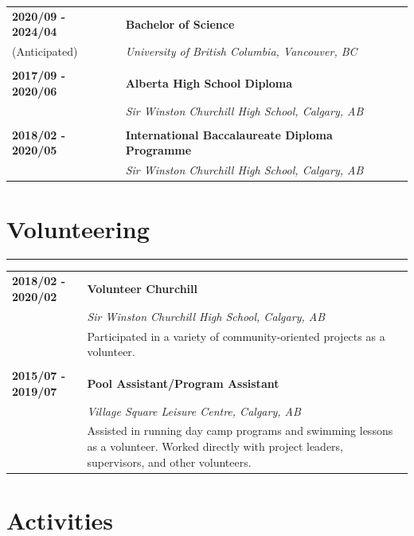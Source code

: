 \documentclass[letterpaper]{article}
\newcommand{\horizontalLine}{%
    \rule{\textwidth}{0.2pt}
    \vspace{1ex}
}
\begin{document}
        \begin{tabular}{p{} p{}} 
            \textbf{2020/09 - 2024/04} & \large\textbf{Bachelor of Science} \\
            (Anticipated) & \emph{University of British Columbia, Vancouver, BC} \\
            \\
            \textbf{2017/09 - 2020/06} & \large\textbf{Alberta High School Diploma} \\
            & \emph{Sir Winston Churchill High School, Calgary, AB} \\
            \\
            \textbf{2018/02 - 2020/05} & \large\textbf{International Baccalaureate Diploma Programme} \\
            & \emph{Sir Winston Churchill High School, Calgary, AB} \\
        \end{tabular}

    \section*{Volunteering}

        \horizontalLine

        \begin{tabular}{p{} p{}} 
            \textbf{2018/02 - 2020/02} & \large\textbf{Volunteer Churchill} \\
            & \emph{Sir Winston Churchill High School, Calgary, AB} \\
            & Participated in a variety of community-oriented projects as a volunteer. \\
            \\
            \textbf{2015/07 - 2019/07} & \large\textbf{Pool Assistant/Program Assistant} \\
            & \emph{Village Square Leisure Centre, Calgary, AB} \\
            & Assisted in running day camp programs and swimming lessons as a volunteer.
            Worked directly with project leaders, supervisors, and other volunteers. \\
        \end{tabular}

    \section*{Activities}
\end{document}
